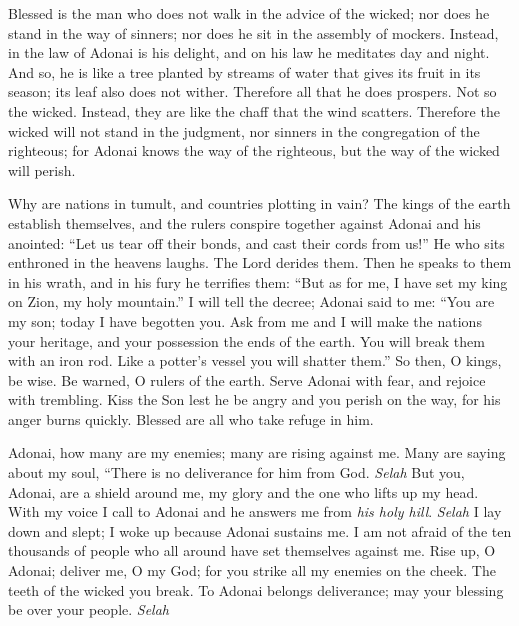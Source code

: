 
\begin{biblechapter} %
 Blessed is the man who does not walk in the advice of the wicked; 
nor does he stand in the way of sinners; 
nor does he sit in the assembly of mockers.
\verse Instead, in the law of Adonai is his delight, 
and on his law he meditates day and night.
\verse And so, he is like a tree planted by streams of water 
that gives its fruit in its season; 
its leaf also does not wither. 
Therefore all that he does prospers.
\verse Not so the wicked. 
Instead, they are like the chaff that the wind scatters.
\verse Therefore the wicked will not stand in the judgment, 
nor sinners in the congregation of the righteous;
\verse for Adonai knows the way of the righteous, 
but the way of the wicked will perish.
\end{biblechapter}

\begin{biblechapter} %
 Why are nations in tumult, 
and countries plotting in vain?
\verse The kings of the earth establish themselves, 
and the rulers conspire together 
against Adonai and his anointed:
\verse “Let us tear off their bonds, 
and cast their cords from us!”
\verse He who sits enthroned in the heavens laughs. 
The Lord derides them.
\verse Then he speaks to them in his wrath, 
and in his fury he terrifies them:
\verse “But as for me, I have set my king 
on Zion, my holy mountain.”
\verse I will tell the decree; 
Adonai said to me: 
“You are my son; 
today I have begotten you.
\verse Ask from me and I will make the nations your heritage, 
and your possession the ends of the earth.
\verse You will break them with an iron rod. 
Like a potter’s vessel you will shatter them.”
\verse So then, O kings, be wise. 
Be warned, O rulers of the earth.
\verse Serve Adonai with fear, 
and rejoice with trembling.
\verse Kiss the Son 
lest he be angry and you perish on the way, 
for his anger burns quickly. 
Blessed are all who take refuge in him.
\end{biblechapter}

\begin{biblechapter} %
 Adonai, how many are my enemies; 
many are rising against me.
\verse Many are saying about my soul, 
“There is no deliverance for him from God. \textit{Selah}
\verse But you, Adonai, are a shield around me, 
my glory and the one who lifts up my head.
\verse With my voice I call to Adonai 
and he answers me from \textit{his holy hill}. \textit{Selah}
\verse I lay down and slept; 
I woke up because Adonai sustains me.
\verse I am not afraid of the ten thousands of people 
who all around have set themselves against me.
\verse Rise up, O Adonai; deliver me, O my God; 
for you strike all my enemies on the cheek. 
The teeth of the wicked you break.
\verse To Adonai belongs deliverance; 
may your blessing be over your people. \textit{Selah}
\end{biblechapter}


